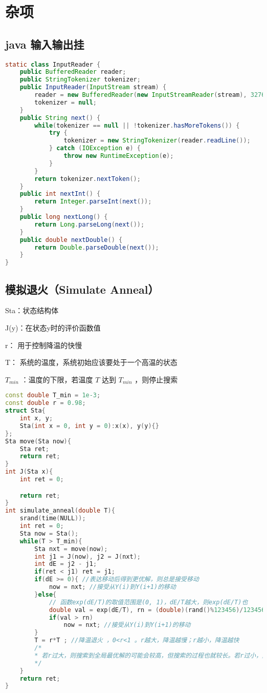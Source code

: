 

\section{杂项}

\subsection{java 输入输出挂}

\begin{lstlisting}[language=java]
static class InputReader {
    public BufferedReader reader;
    public StringTokenizer tokenizer;
    public InputReader(InputStream stream) {
        reader = new BufferedReader(new InputStreamReader(stream), 32768);
        tokenizer = null;
    }
    public String next() {
        while(tokenizer == null || !tokenizer.hasMoreTokens()) {
            try {
                tokenizer = new StringTokenizer(reader.readLine());
            } catch (IOException e) {
                throw new RuntimeException(e);
            }
        }
        return tokenizer.nextToken();
    }
    public int nextInt() {
        return Integer.parseInt(next());
    }
    public long nextLong() {
        return Long.parseLong(next());
    }
    public double nextDouble() {
        return Double.parseDouble(next());
    }
}
\end{lstlisting}

\subsection{模拟退火（Simulate Anneal）}

Sta：状态结构体

J(y)：在状态y时的评价函数值

r： 用于控制降温的快慢

T： 系统的温度，系统初始应该要处于一个高温的状态

$T_{min}$ ：温度的下限，若温度 $T$ 达到 $T_{min}$ ，则停止搜索

\begin{lstlisting}[language=C++]
    const double T_min = 1e-3;
const double r = 0.98;
struct Sta{
    int x, y;
    Sta(int x = 0, int y = 0):x(x), y(y){}
};
Sta move(Sta now){
    Sta ret;
    return ret;
}
int J(Sta x){
    int ret = 0;

    return ret;
}
int simulate_anneal(double T){
    srand(time(NULL));
    int ret = 0;
    Sta now = Sta();
    while(T > T_min){
        Sta nxt = move(now);
        int j1 = J(now), j2 = J(nxt);
        int dE = j2 - j1;
        if(ret < j1) ret = j1;
        if(dE >= 0){ //表达移动后得到更优解，则总是接受移动
            now = nxt; //接受从Y(i)到Y(i+1)的移动
        }else{
            // 函数exp(dE/T)的取值范围是(0, 1)，dE/T越大，则exp(dE/T)也
            double val = exp(dE/T), rn = (double)(rand()%123456)/123456.0;
            if(val > rn)
                now = nxt; //接受从Y(i)到Y(i+1)的移动
        }
        T = r*T ; //降温退火 ，0<r<1 。r越大，降温越慢；r越小，降温越快
        /*
        * 若r过大，则搜索到全局最优解的可能会较高，但搜索的过程也就较长。若r过小，则搜索的过程会很快，但最终可能会达到一个局部最优值
        */
    }
    return ret;
}
\end{lstlisting}

